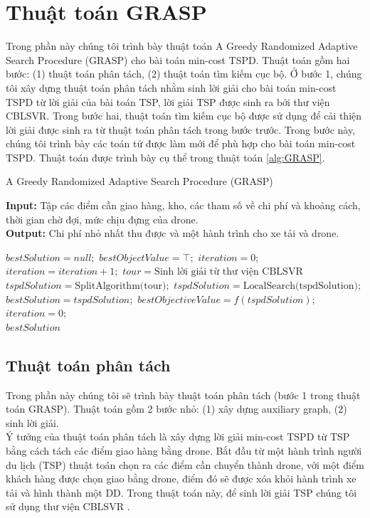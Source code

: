 \documentclass[a4paper,12pt]{report}
\begin{document}
\section{Thuật toán GRASP}
\label{section:grasp}
Trong phần này chúng tôi trình bày thuật toán A Greedy Randomized Adaptive Search Procedure (GRASP) cho bài toán min-cost TSPD. Thuật toán gồm hai bước: (1) thuật toán phân tách, (2) thuật toán tìm kiếm cục bộ. Ở bước 1, chúng tôi xây dựng thuật toán phân tách nhằm sinh lời giải cho bài toán min-cost TSPD từ lời giải của bài toán TSP, lời giải TSP được sinh ra bởi thư viện CBLSVR. Trong bước hai, thuật toán tìm kiếm cục bộ được sử dụng để cải thiện lời giải được sinh ra từ thuật toán phân tách trong bước trước. Trong bước này, chúng tôi trình bày các toán tử được làm mới để phù hợp cho bài toán min-cost TSPD. Thuật toán được trình bày cụ thể trong thuật toán \ref{alg:GRASP}.
\begin{algorithm}[H]
\caption{A Greedy Randomized Adaptive Search Procedure (GRASP)}
\textbf{Input:} Tập các điểm cần giao hàng, kho, các tham số về chi phí và khoảng cách, thời gian chờ đợi, mức chịu đựng của drone.\\
\textbf{Output:} Chi phí nhỏ nhất thu được và một hành trình cho xe tải và drone.
\begin{algorithmic}[1]
\State $bestSolution=null;$
\State $bestObjectValue=\top;$
\State $iteration=0;$
\State $iteration=iteration+1;$
\State $tour=\text{Sinh lời giải từ thư viện CBLSVR}$
\State $tspdSolution=\text{SplitAlgorithm(tour)};$
\State $tspdSolution=\text{LocalSearch(tspdSolution)};$
\State $bestSolution=tspdSolution;$
\State $bestObjectiveValue=f(tspdSolution);$
\State $iteration=0;$
\EndIf
\EndWhile\\
\Return $bestSolution$
\end{algorithmic}
\label{alg:GRASP}
\end{algorithm}
\subsection{Thuật toán phân tách}
Trong phần này chúng tôi sẽ trình bày thuật toán phân tách (bước 1 trong thuật toán GRASP). Thuật toán gồm 2 bước nhỏ: (1) xây dựng auxiliary graph, (2) sinh lời giải. \\

Ý tưởng của thuật toán phân tách là xây dựng lời giải min-cost TSPD từ TSP bằng cách tách các điểm giao hàng bằng drone. Bắt đầu từ một hành trình người du lịch (TSP) thuật toán chọn ra các điểm cần chuyển thành drone, với một điểm khách hàng được chọn giao bằng drone, điểm đó sẽ được xóa khỏi hành trình xe tải và hình thành một DD. Trong thuật toán này, để sinh lời giải \ac{TSP} chúng tôi sử dụng thư viện CBLSVR \cite{CBLSVR}.
\end{document}
